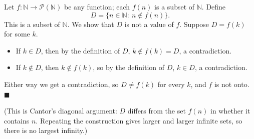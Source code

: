 Let $f:\mathbb{N}\to\mathcal{P}(\mathbb{N})$ be any function; each $f(n)$ is a subset of $\mathbb{N}$. Define
\[D=\{n\in\mathbb{N}:\ n\notin f(n)\}.\]
This is a subset of $\mathbb{N}$. We show that $D$ is not a value of $f$. Suppose $D=f(k)$ for some $k$.
\begin{itemize}
\item If $k\in D$, then by the definition of $D$, $k\notin f(k)=D$, a contradiction.
\item If $k\notin D$, then $k\notin f(k)$, so by the definition of $D$, $k\in D$, a contradiction.
\end{itemize}
Either way we get a contradiction, so $D\ne f(k)$ for every $k$, and $f$ is not onto. $\blacksquare$

(This is Cantor's diagonal argument: $D$ differs from the set $f(n)$ in whether it contains $n$. Repeating the construction gives larger and larger infinite sets, so there is no largest infinity.)
